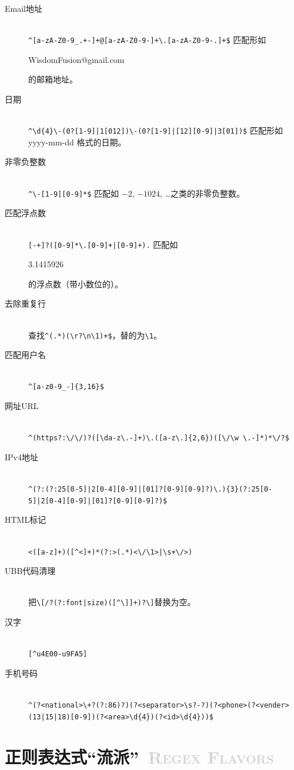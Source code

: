 \documentclass[12pt,a4paper,twoside]{ctexart}
\newcommand{\cbmatch}[1]{\colorbox{cyan!35}{\strut #1}}
\begin{document}
\begin{description}
\item[Email地址] \hfill \\
  \verb=^[a-zA-Z0-9_.+-]+@[a-zA-Z0-9-]+\.[a-zA-Z0-9-.]+$= 匹配形如 \cbmatch{WisdomFusion@gmail.com} 的邮箱地址。
\item[日期] \hfill \\
  \verb=^\d{4}\-(0?[1-9]|1[012])\-(0?[1-9]|[12][0-9]|3[01])$= 匹配形如 yyyy-mm-dd 格式的日期。
\item[非零负整数] \hfill \\
  \verb=^\-[1-9][0-9]*$= 匹配如 $-2$, $-1024$, \ldots 之类的非零负整数。
\item[匹配浮点数] \hfill \\
  \verb=[-+]?([0-9]*\.[0-9]+|[0-9]+).= 匹配如 \cbmatch{3.1415926} 的浮点数（带小数位的）{}。
\item[去除重复行] \hfill \\
  查找\verb=^(.*)(\r?\n\1)+$=，替的为\verb=\1=。
\item[匹配用户名] \hfill \\
  \verb=^[a-z0-9_-]{3,16}$=
\item[网址URL] \hfill \\
  \verb=^(https?:\/\/)?([\da-z\.-]+)\.([a-z\.]{2,6})([\/\w \.-]*)*\/?$=
\item[IPv4地址] \hfill \\
  \verb=^(?:(?:25[0-5]|2[0-4][0-9]|[01]?[0-9][0-9]?)\.){3}(?:25[0-5]|2[0-4][0-9]|[01]?[0-9][0-9]?)$=
\item[HTML标记] \hfill \\
  \verb=<([a-z]+)([^<]+)*(?:>(.*)<\/\1>|\s+\/>)=
\item[UBB代码清理] \hfill \\
  把\verb=\[/?(?:font|size)([^\]]+)?\]=替换为空。
\item[汉字] \hfill \\
  \verb=[^u4E00-u9FA5]=
\item[手机号码] \hfill \\
  \verb=^(?<national>\+?(?:86)?)(?<separator>\s?-?)(?<phone>(?<vender>(13|15|18)[0-9])(?<area>\d{4})(?<id>\d{4}))$=
\end{description}

\section[正则表达式“流派”]{正则表达式“流派”~\textcolor{lightgray}{\textsc{Regex Flavors}}}
\label{sec:flavor}
\end{document}

